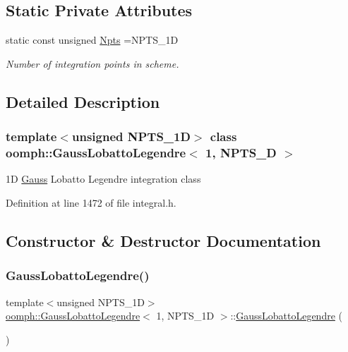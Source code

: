 \subsection*{Static Private Attributes}
\begin{DoxyCompactItemize}
\item 
static const unsigned \hyperlink{classoomph_1_1GaussLobattoLegendre_3_011_00_01NPTS__1D_01_4_ac6fa89f49e0b7d26e344a5b8a4973b00}{Npts} =N\+P\+T\+S\+\_\+1D
\begin{DoxyCompactList}\small\item\em Number of integration points in scheme. \end{DoxyCompactList}\end{DoxyCompactItemize}


\subsection{Detailed Description}
\subsubsection*{template$<$unsigned N\+P\+T\+S\+\_\+1D$>$\newline
class oomph\+::\+Gauss\+Lobatto\+Legendre$<$ 1, N\+P\+T\+S\+\_\+D $>$}

1D \hyperlink{classoomph_1_1Gauss}{Gauss} Lobatto Legendre integration class 

Definition at line 1472 of file integral.\+h.



\subsection{Constructor \& Destructor Documentation}
\mbox{\label{classoomph_1_1GaussLobattoLegendre_3_011_00_01NPTS__1D_01_4_a9f4ffd01db8b67754125ea0f4e9d937a}} 
\subsubsection{\texorpdfstring{Gauss\+Lobatto\+Legendre()}{GaussLobattoLegendre()}}
{\footnotesize\ttfamily template$<$unsigned N\+P\+T\+S\+\_\+1D$>$ \\
\hyperlink{classoomph_1_1GaussLobattoLegendre}{oomph\+::\+Gauss\+Lobatto\+Legendre}$<$ 1, N\+P\+T\+S\+\_\+1D $>$\+::\hyperlink{classoomph_1_1GaussLobattoLegendre}{Gauss\+Lobatto\+Legendre} (\begin{DoxyParamCaption}{ }\end{DoxyParamCaption})}



